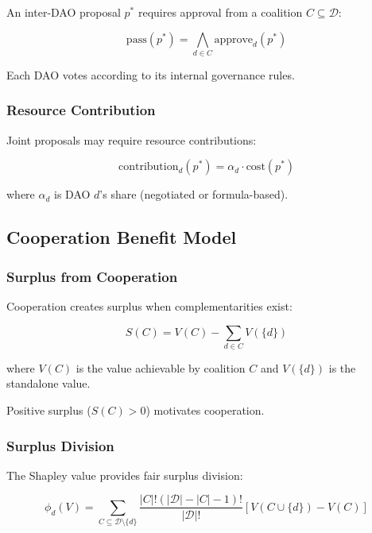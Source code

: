 An inter-DAO proposal $p^*$ requires approval from a coalition $C \subseteq \mathcal{D}$:

\begin{equation}
\text{pass}(p^*) = \bigwedge_{d \in C} \text{approve}_d(p^*)
\end{equation}

Each DAO votes according to its internal governance rules.

\subsubsection{Resource Contribution}

Joint proposals may require resource contributions:

\begin{equation}
\text{contribution}_d(p^*) = \alpha_d \cdot \text{cost}(p^*)
\end{equation}

where $\alpha_d$ is DAO $d$'s share (negotiated or formula-based).

\subsection{Cooperation Benefit Model}

\subsubsection{Surplus from Cooperation}

Cooperation creates surplus when complementarities exist:

\begin{equation}
S(C) = V(C) - \sum_{d \in C} V(\{d\})
\end{equation}

where $V(C)$ is the value achievable by coalition $C$ and $V(\{d\})$ is the standalone value.

Positive surplus ($S(C) > 0$) motivates cooperation.

\subsubsection{Surplus Division}

The Shapley value provides fair surplus division:

\begin{equation}
\phi_d(V) = \sum_{C \subseteq \mathcal{D} \setminus \{d\}} \frac{|C|!(|\mathcal{D}| - |C| - 1)!}{|\mathcal{D}|!} [V(C \cup \{d\}) - V(C)]
\end{equation}

